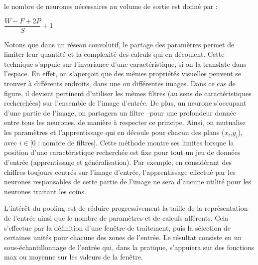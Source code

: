       le nombre de neurones nécessaires au volume de sortie est donné par :
      \begin{center}
      $ \dfrac{W-F+2P}{S}+1$
      \end{center}

      Notons que dans un réseau convolutif, le partage des paramètres permet de limiter leur quantité et la complexité des calculs qui en découlent.
      Cette technique s’appuie sur l’invariance d’une caractéristique, si on la translate dans l’espace.
      En effet, on s’aperçoit que des mêmes propriétés visuelles peuvent se trouver à différents endroits, dans une ou différentes images.
      Dans ce cas de figure, il devient pertinent d’utiliser les mêmes filtres (au sens de caractéristiques recherchées) sur l’ensemble de l’image d’entrée.
      De plus, un neurone s’occupant d’une partie de l’image, on partagera un filtre –pour une profondeur donnée– entre tous les neurones, de manière à respecter ce principe.
      Ainsi, on mutualise les paramètres et l’apprentissage qui en découle pour chacun des plans ($x_{i}$,$y_{i}$), avec $i  \in [0$ ; nombre de filtres$]$.
      Cette méthode montre ses limites lorsque la position d’une caractéristique recherchée est fixe pour tout un jeu de données d’entrée (apprentissage et généralisation).
      Par exemple, en considérant des chiffres toujours centrés sur l’image d’entrée, l’apprentissage effectué par les neurones responsables de cette partie de l’image ne sera d’aucune utilité pour les neurones traitant les coins.
      \par
      L’intérêt du pooling est de réduire progressivement la taille de la représentation de l’entrée ainsi que le nombre de paramètres et de calculs afférents.
      Cela s’effectue par la définition d’une fenêtre de traitement, puis la sélection de certaines unités pour chacune des zones de l’entrée.
      Le résultat consiste en un sous-échantillonnage de l’entrée qui, dans la pratique, s’appuiera sur des fonctions max ou moyenne sur les valeurs de la fenêtre.